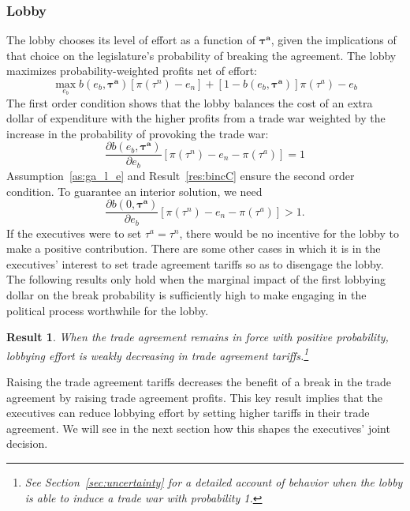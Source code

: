 \documentclass[10pt]{article}
\newtheorem{result}{Result}
\newcommand{\bta}{\bm{\tau^a}}
\begin{document}
\subsubsection{Lobby}
\label{sec:lob_un}
The lobby chooses its level of effort as a function of $\bta$, given the implications of that choice on the legislature's probability of breaking the agreement. The lobby maximizes probability-weighted profits net of effort:
\[
  \max_{e_b} b(e_b,\bta) \left[\pi(\tau^n) - e_n \right] + [1 - b(e_b,\bta)] \pi(\tau^a) - e_b
\]
The first order condition shows that the lobby balances the cost of an extra dollar of expenditure with the higher profits from a trade war weighted by the increase in the probability of provoking the trade war:
\begin{equation}
	\frac{\partial b(e_b,\bta)}{\partial e_b} \left[ \pi(\tau^n) -e_n - \pi(\tau^a) \right] = 1 
	\label{eq:lobbyfoc}
\end{equation}
Assumption~\ref{as:ga_l_e} and Result~\ref{res:bincC} ensure the second order condition. To guarantee an interior solution, we need
  \begin{equation}
	  \frac{\partial b(0,\bta)}{\partial e_b} \left[ \pi(\tau^n) -e_n- \pi(\tau^a) \right] > 1.
		\label{ine:lobint}	
  \end{equation}
If the executives were to set $\tau^a = \tau^n$, there would be no incentive for the lobby to make a positive contribution. There are some other cases in which it is in the executives' interest to set trade agreement tariffs so as to disengage the lobby. The following results only hold when the marginal impact of the first lobbying dollar on the break probability is sufficiently high to make engaging in the political process worthwhile for the lobby.
  
\begin{result}
  When the trade agreement remains in force with positive probability, lobbying effort is weakly decreasing in trade agreement tariffs.\footnote{See Section~\ref{sec:uncertainty} for a detailed account of behavior when the lobby is able to induce a trade war with probability 1.}
  \label{res:lobby}
\end{result}

\noindent Raising the trade agreement tariffs decreases the benefit of a break in the trade agreement by raising trade agreement profits. This key result implies that the executives can reduce lobbying effort by setting higher tariffs in their trade agreement. We will see in the next section how this shapes the executives' joint decision. 
\end{document}
